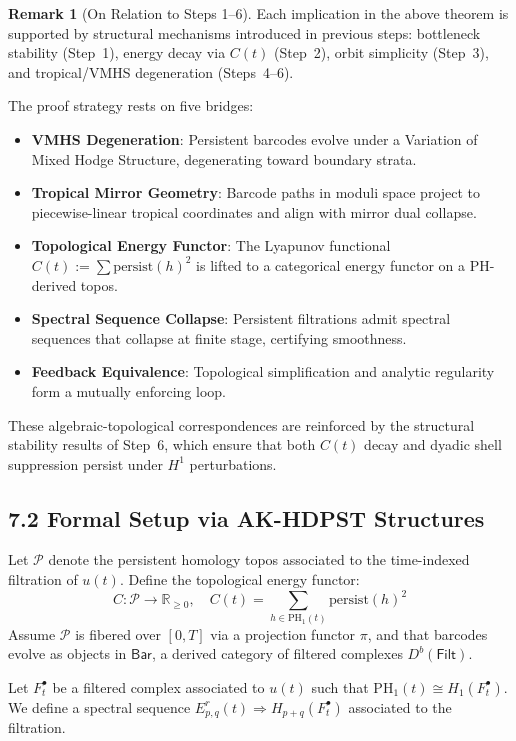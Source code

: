 \documentclass[11pt]{article}
\theoremstyle{definition}
\newtheorem{remark}[theorem]{Remark}
\begin{document}
\begin{remark}[On Relation to Steps 1--6]
Each implication in the above theorem is supported by structural mechanisms introduced in previous steps: bottleneck stability (Step~1), energy decay via $C(t)$ (Step~2), orbit simplicity (Step~3), and tropical/VMHS degeneration (Steps~4--6).
\end{remark}

The proof strategy rests on five bridges:
\begin{itemize}
    \item \textbf{VMHS Degeneration}: Persistent barcodes evolve under a Variation of Mixed Hodge Structure, degenerating toward boundary strata.
    \item \textbf{Tropical Mirror Geometry}: Barcode paths in moduli space project to piecewise-linear tropical coordinates and align with mirror dual collapse.
    \item \textbf{Topological Energy Functor}: The Lyapunov functional $C(t) := \sum \text{persist}(h)^2$ is lifted to a categorical energy functor on a PH-derived topos.
    \item \textbf{Spectral Sequence Collapse}: Persistent filtrations admit spectral sequences that collapse at finite stage, certifying smoothness.
    \item \textbf{Feedback Equivalence}: Topological simplification and analytic regularity form a mutually enforcing loop.
\end{itemize}

These algebraic-topological correspondences are reinforced by the structural stability results of Step~6, which ensure that both $C(t)$ decay and dyadic shell suppression persist under $H^1$ perturbations.

\subsection*{7.2 Formal Setup via AK-HDPST Structures}

Let $\mathcal{P}$ denote the persistent homology topos associated to the time-indexed filtration of $u(t)$. Define the topological energy functor:
\[
C: \mathcal{P} \to \mathbb{R}_{\geq 0}, \quad C(t) = \sum_{h \in \mathrm{PH}_1(t)} \text{persist}(h)^2
\]
Assume $\mathcal{P}$ is fibered over $[0,T]$ via a projection functor $\pi$, and that barcodes evolve as objects in $\mathsf{Bar}$, a derived category of filtered complexes $D^b(\mathsf{Filt})$.

Let $F^\bullet_t$ be a filtered complex associated to $u(t)$ such that $\mathrm{PH}_1(t) \cong H_1(F^\bullet_t)$. We define a spectral sequence $E^r_{p,q}(t) \Rightarrow H_{p+q}(F^\bullet_t)$ associated to the filtration.
\end{document}
